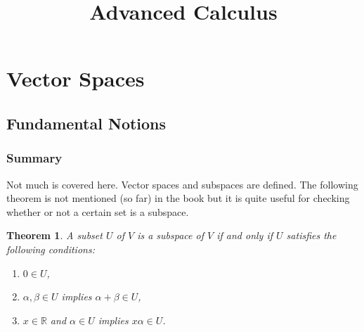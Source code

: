 \documentclass[]{article}
\title{Advanced Calculus}
\author{}
\date{}
\newcommand{\RR}{\mathbb{R}}
\newtheorem{theorem}{Theorem}[section]
\theoremstyle{definition}
\begin{document}
\maketitle
\newpage
\tableofcontents
\newpage

\section{Vector Spaces}
\subsection{Fundamental Notions}
\subsubsection{Summary}
Not much is covered here. Vector spaces and subspaces are defined.
The following theorem is not mentioned (so far) in the book but it is quite useful for checking whether or not a certain set is a subspace.
\begin{theorem}\label{subspace:1}
	A subset $U$ of $V$ is a subspace of $V$ if and only if $U$ satisfies the following conditions:
	\begin{enumerate}
		\item $0 \in U$,
		\item $\alpha, \beta \in U$ implies $\alpha + \beta \in U$,
		\item $x \in \RR$ and $\alpha \in U$ implies $x\alpha \in U$.
	\end{enumerate}
\end{theorem}
\end{document}
